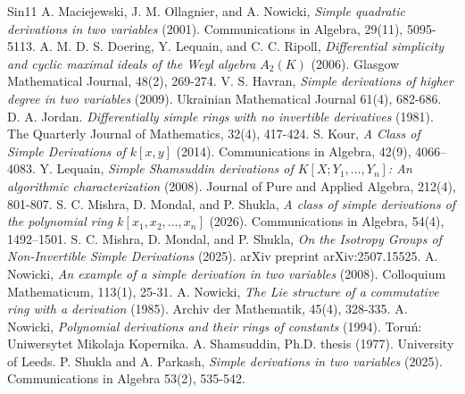 \documentclass[12pt,reqno]{amsart}
\numberwithin{thm}{section}
\theoremstyle{definition}
\numberwithin{equation}{thm}
\theoremstyle{plain}
\begin{document}
\begin{thebibliography}{Sin11}
 A. Maciejewski, J. M. Ollagnier, and A. Nowicki, \emph{Simple quadratic derivations in two variables} (2001). Communications in Algebra, 29(11), 5095-5113.
 A. M. D. S.  Doering, Y. Lequain, and C. C. Ripoll,  \emph{Differential simplicity and cyclic maximal ideals of the Weyl algebra $A_2(K)$} (2006). Glasgow Mathematical Journal, 48(2), 269-274.
 V. S. Havran, \emph{Simple derivations of higher degree in two variables} (2009). Ukrainian Mathematical Journal 61(4), 682-686.
 D. A. Jordan. \emph{Differentially simple rings with no invertible derivatives} (1981). The Quarterly Journal of Mathematics, 32(4), 417-424.
S. Kour, \emph{A Class of Simple Derivations of $k[x, y]$} (2014). Communications in Algebra, 42(9), 4066–4083.
 Y. Lequain, \emph{Simple Shamsuddin derivations of $K [X;Y_1,\ldots,Y_n]$: An algorithmic characterization} (2008). Journal of Pure and Applied Algebra, 212(4), 801-807.
S. C. Mishra, D. Mondal, and P. Shukla, \emph{A class of simple derivations of the polynomial ring $k[x_1,x_2,\dots,x_n]$} (2026). Communications in Algebra, 54(4), 1492–1501.
 S. C. Mishra, D. Mondal, and P. Shukla, \emph{On the Isotropy Groups of Non-Invertible Simple Derivations} (2025). arXiv preprint arXiv:2507.15525.
 A. Nowicki, \emph{An example of a simple derivation in two variables} (2008). Colloquium Mathematicum, 113(1), 25-31.
 A. Nowicki, \emph{The Lie structure of a commutative ring with a derivation} (1985). Archiv der Mathematik, 45(4), 328-335.
 A. Nowicki, \emph{Polynomial derivations and their rings of constants} (1994). Toruń: Uniwersytet Mikolaja Kopernika.
 A. Shamsuddin, Ph.D. thesis (1977). University of Leeds.
P. Shukla and A. Parkash, \emph{Simple derivations in two variables} (2025). Communications in Algebra 53(2), 535-542.
\end{thebibliography}
\end{document}

